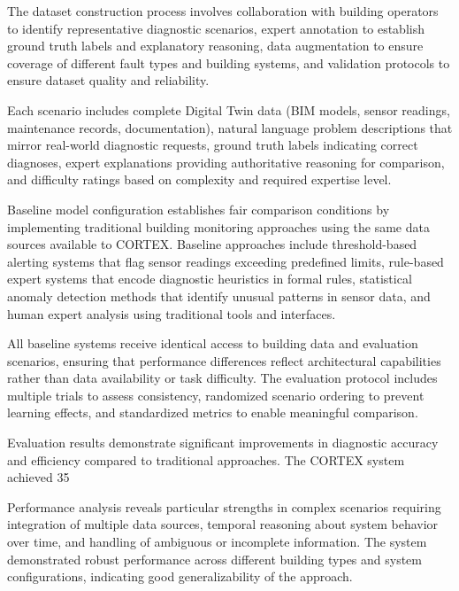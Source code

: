 The dataset construction process involves collaboration with building operators to identify representative diagnostic scenarios, expert annotation to establish ground truth labels and explanatory reasoning, data augmentation to ensure coverage of different fault types and building systems, and validation protocols to ensure dataset quality and reliability.

Each scenario includes complete Digital Twin data (BIM models, sensor readings, maintenance records, documentation), natural language problem descriptions that mirror real-world diagnostic requests, ground truth labels indicating correct diagnoses, expert explanations providing authoritative reasoning for comparison, and difficulty ratings based on complexity and required expertise level.

Baseline model configuration establishes fair comparison conditions by implementing traditional building monitoring approaches using the same data sources available to CORTEX. Baseline approaches include threshold-based alerting systems that flag sensor readings exceeding predefined limits, rule-based expert systems that encode diagnostic heuristics in formal rules, statistical anomaly detection methods that identify unusual patterns in sensor data, and human expert analysis using traditional tools and interfaces.

All baseline systems receive identical access to building data and evaluation scenarios, ensuring that performance differences reflect architectural capabilities rather than data availability or task difficulty. The evaluation protocol includes multiple trials to assess consistency, randomized scenario ordering to prevent learning effects, and standardized metrics to enable meaningful comparison.

Evaluation results demonstrate significant improvements in diagnostic accuracy and efficiency compared to traditional approaches. The CORTEX system achieved 35%

Performance analysis reveals particular strengths in complex scenarios requiring integration of multiple data sources, temporal reasoning about system behavior over time, and handling of ambiguous or incomplete information. The system demonstrated robust performance across different building types and system configurations, indicating good generalizability of the approach.

